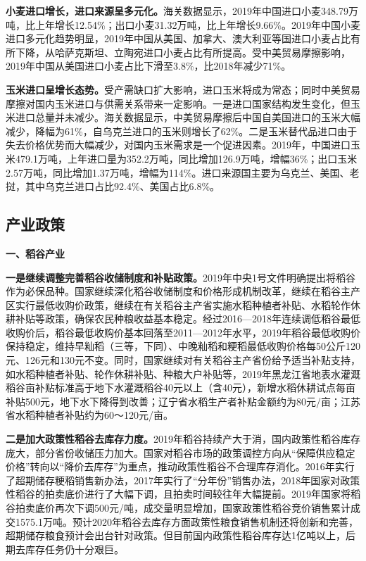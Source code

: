 \documentclass{progbookcn}
\begin{document}
\textbf{
小麦进口增长，进口来源呈多元化。}海关数据显示，2019年中国进口小麦348.79万吨，比上年增长12.54\%；出口小麦31.32万吨，比上年增长9.66\%。2019年中国小麦进口多元化趋势明显，2019年中国从美国、加拿大、澳大利亚等国进口小麦占比有所下降，从哈萨克斯坦、立陶宛进口小麦占比有所提高。受中美贸易摩擦影响，2019年中国从美国进口小麦占比下滑至3.8\%，比2018年减少71\%。

\textbf{玉米进口呈增长态势。}受产需缺口扩大影响，进口玉米将成为常态；同时中美贸易摩擦对国内玉米进口与供需关系带来一定影响。一是进口国家结构发生变化，但玉米进口总量并未减少。海关数据显示，中美贸易摩擦后中国自美国进口的玉米大幅减少，降幅为61\%，自乌克兰进口的玉米则增长了62\%。二是玉米替代品进口由于失去价格优势而大幅减少，对国内玉米需求是一个促进因素。2019年，中国进口玉米479.1万吨，上年进口量为352.2万吨，同比增加126.9万吨，增幅36\%；出口玉米2.57万吨，同比增加1.37万吨，增幅为114\%。进口来源国主要为乌克兰、美国、老挝，其中乌克兰进口占比92.4\%、美国占比6.8\%。

\subsection{产业政策}
\textbf{一、稻谷产业}

\textbf{一是继续调整完善稻谷收储制度和补贴政策。}2019年中央1号文件明确提出将稻谷作为必保品种。国家继续深化稻谷收储制度和价格形成机制改革，继续在稻谷主产区实行最低收购价政策，继续在有关稻谷主产省实施水稻种植者补贴、水稻轮作休耕补贴等政策，确保农民种粮收益基本稳定。经过2016—2018年连续调低稻谷最低收购价后，稻谷最低收购价基本回落至2011—2012年水平，2019年稻谷最低收购价保持稳定，维持早籼稻（三等，下同）、中晚籼稻和粳稻最低收购价格每50公斤120元、126元和130元不变。同时，国家继续对有关稻谷主产省份给予适当补贴支持，如水稻种植者补贴、轮作休耕补贴、种粮大户补贴等，2019年黑龙江省地表水灌溉稻谷亩补贴标准高于地下水灌溉稻谷40元以上（含40元），新增水稻休耕试点每亩补贴500元，地下水下降得到改善；辽宁省水稻生产者补贴金额约为80元/亩；江苏省水稻种植者补贴约为60～120元/亩。

\textbf{二是加大政策性稻谷去库存力度。}2019年稻谷持续产大于消，国内政策性稻谷库存庞大，部分省份收储压力加大。国家对稻谷市场的政策调控方向从“保障供应稳定价格”转向以“降价去库存”为重点，推动政策性稻谷不合理库存消化。2016年实行了超期储存粳稻销售新办法，2017年实行了“分年份”销售办法，2018年国家对政策性稻谷的拍卖底价进行了大幅下调，且拍卖时间较往年大幅提前。2019年国家将稻谷拍卖底价再次下调500元/吨，成交量明显增加，国家政策性稻谷竞价销售累计成交1575.1万吨。预计2020年稻谷去库存方面政策性粮食销售机制还将创新和完善，超期储存粮食预计会出台针对政策。但目前国内政策性稻谷库存达1亿吨以上，后期去库存任务仍十分艰巨。
\end{document}
